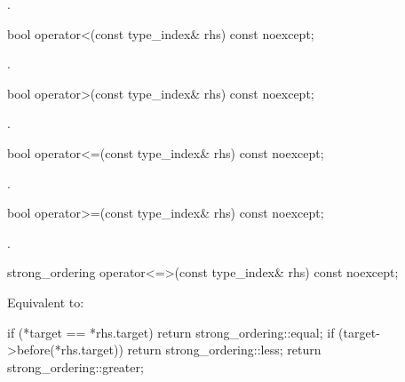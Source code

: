 \begin{itemdescr}
\pnum
\returns
{}.
\end{itemdescr}

%
\begin{itemdecl}
bool operator<(const type_index& rhs) const noexcept;
\end{itemdecl}

\begin{itemdescr}
\pnum
\returns
{}.
\end{itemdescr}

%
\begin{itemdecl}
bool operator>(const type_index& rhs) const noexcept;
\end{itemdecl}

\begin{itemdescr}
\pnum
\returns
{}.
\end{itemdescr}

%
\begin{itemdecl}
bool operator<=(const type_index& rhs) const noexcept;
\end{itemdecl}

\begin{itemdescr}
\pnum
\returns
{}.
\end{itemdescr}

%
\begin{itemdecl}
bool operator>=(const type_index& rhs) const noexcept;
\end{itemdecl}

\begin{itemdescr}
\pnum
\returns
{}.
\end{itemdescr}

%
\begin{itemdecl}
strong_ordering operator<=>(const type_index& rhs) const noexcept;
\end{itemdecl}

\begin{itemdescr}
\pnum
\effects
Equivalent to:
\begin{codeblock}
if (*target == *rhs.target) return strong_ordering::equal;
if (target->before(*rhs.target)) return strong_ordering::less;
return strong_ordering::greater;
\end{codeblock}
\end{itemdescr}

